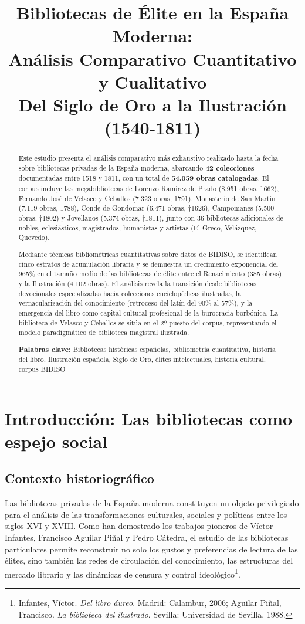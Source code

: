 \documentclass[12pt,a4paper]{article}
\title{
    {\Large\textbf{Bibliotecas de Élite en la España Moderna:}}\\[0.5cm]
    {\large\textbf{Análisis Comparativo Cuantitativo y Cualitativo}}\\[0.3cm]
    {\large Del Siglo de Oro a la Ilustración (1540-1811)}
}
\author{}
\date{}
\begin{document}
\maketitle

\begin{abstract}
Este estudio presenta el análisis comparativo más exhaustivo realizado hasta la fecha sobre bibliotecas privadas de la España moderna, abarcando \textbf{42 colecciones} documentadas entre 1518 y 1811, con un total de \textbf{54.059 obras catalogadas}. El corpus incluye las megabibliotecas de Lorenzo Ramírez de Prado (8.951 obras, 1662), Fernando José de Velasco y Ceballos (7.323 obras, 1791), Monasterio de San Martín (7.119 obras, 1788), Conde de Gondomar (6.471 obras, †1626), Campomanes (5.500 obras, †1802) y Jovellanos (5.374 obras, †1811), junto con 36 bibliotecas adicionales de nobles, eclesiásticos, magistrados, humanistas y artistas (El Greco, Velázquez, Quevedo).

Mediante técnicas bibliométricas cuantitativas sobre datos de BIDISO, se identifican cinco estratos de acumulación libraria y se demuestra un crecimiento exponencial del 965\% en el tamaño medio de las bibliotecas de élite entre el Renacimiento (385 obras) y la Ilustración (4.102 obras). El análisis revela la transición desde bibliotecas devocionales especializadas hacia colecciones enciclopédicas ilustradas, la vernacularización del conocimiento (retroceso del latín del 90\% al 57\%), y la emergencia del libro como capital cultural profesional de la burocracia borbónica. La biblioteca de Velasco y Ceballos se sitúa en el 2º puesto del corpus, representando el modelo paradigmático de biblioteca magistral ilustrada.

\textbf{Palabras clave:} Bibliotecas históricas españolas, bibliometría cuantitativa, historia del libro, Ilustración española, Siglo de Oro, élites intelectuales, historia cultural, corpus BIDISO
\end{abstract}

\section{Introducción: Las bibliotecas como espejo social}

\subsection{Contexto historiográfico}

Las bibliotecas privadas de la España moderna constituyen un objeto privilegiado para el análisis de las transformaciones culturales, sociales y políticas entre los siglos XVI y XVIII. Como han demostrado los trabajos pioneros de Víctor Infantes, Francisco Aguilar Piñal y Pedro Cátedra, el estudio de las bibliotecas particulares permite reconstruir no solo los gustos y preferencias de lectura de las élites, sino también las redes de circulación del conocimiento, las estructuras del mercado librario y las dinámicas de censura y control ideológico\footnote{Infantes, Víctor. \textit{Del libro áureo}. Madrid: Calambur, 2006; Aguilar Piñal, Francisco. \textit{La biblioteca del ilustrado}. Sevilla: Universidad de Sevilla, 1988.}.
\end{document}
